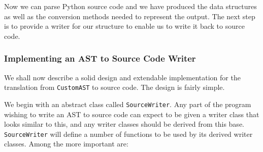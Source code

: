 \documentclass[twoside,a4paper]{report}
\begin{document}
Now we can parse Python source code and we have produced the data structures as well as the conversion methods needed to represent the output. The next
step is to provide a writer for our structure to enable us to write it back to source code.

\subsubsection{Implementing an AST to Source Code Writer}

We shall now describe a solid design and extendable implementation for the translation from \texttt{CustomAST} to source code. The design is fairly simple.

We begin with an abstract class called \texttt{SourceWriter}. Any part of the program wishing to write an AST to source code can expect to be given a writer
class that looks similar to this, and any writer classes should be derived from this base. \texttt{SourceWriter} will define a number of functions
to be used by its derived writer classes. Among the more important are:
\end{document}
